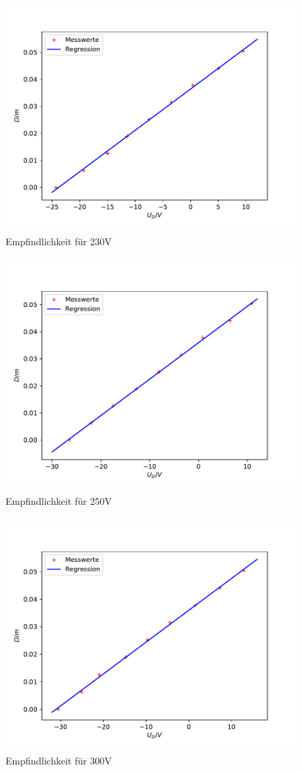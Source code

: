 \begin{figure}[H]
\centering
\includegraphics[height=9cm]{plot230b.pdf}
\caption{Empfindlichkeit für 230V}
\label{fig:230b}
\end{figure}
\begin{figure}[H]
\centering
\includegraphics[height=9cm]{plot250b.pdf}
\caption{Empfindlichkeit für 250V}
\label{fig:250b}
\end{figure}
\begin{figure}[H]
\centering
\includegraphics[height=9cm]{plot300b.pdf}
\caption{Empfindlichkeit für 300V}
\label{fig:300b}
\end{figure}
